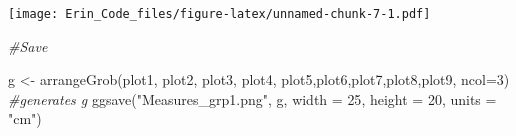 \documentclass[
]{article}
\newenvironment{Shaded}{\begin{snugshade}}{\end{snugshade}}
\newcommand{\AttributeTok}[1]{\textcolor[rgb]{0.77,0.63,0.00}{#1}}
\newcommand{\CommentTok}[1]{\textcolor[rgb]{0.56,0.35,0.01}{\textit{#1}}}
\newcommand{\DecValTok}[1]{\textcolor[rgb]{0.00,0.00,0.81}{#1}}
\newcommand{\FunctionTok}[1]{\textcolor[rgb]{0.00,0.00,0.00}{#1}}
\newcommand{\NormalTok}[1]{#1}
\newcommand{\OtherTok}[1]{\textcolor[rgb]{0.56,0.35,0.01}{#1}}
\newcommand{\StringTok}[1]{\textcolor[rgb]{0.31,0.60,0.02}{#1}}
\begin{document}
\texttt{[image: Erin\_Code\_files/figure-latex/unnamed-chunk-7-1.pdf]}

\begin{Shaded}
\begin{Highlighting}[]
\CommentTok{\#Save}

\NormalTok{g }\OtherTok{\textless{}{-}} \FunctionTok{arrangeGrob}\NormalTok{(plot1, plot2, plot3, plot4, plot5,plot6,plot7,plot8,plot9, }\AttributeTok{ncol=}\DecValTok{3}\NormalTok{) }\CommentTok{\#generates g}
\FunctionTok{ggsave}\NormalTok{(}\StringTok{"Measures\_grp1.png"}\NormalTok{, g, }\AttributeTok{width =} \DecValTok{25}\NormalTok{, }\AttributeTok{height =} \DecValTok{20}\NormalTok{, }\AttributeTok{units =} \StringTok{"cm"}\NormalTok{)}
\end{Highlighting}
\end{Shaded}
\end{document}
